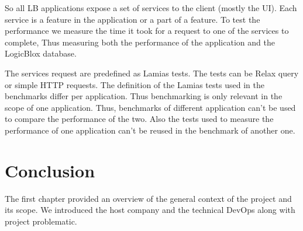 So all LB applications expose a set of services to the client (mostly the UI).
Each service is a feature in the application or a part of a feature. To test the
performance we measure the time it took for a request to one of the services to
complete, Thus measuring both the performance of the application and the
LogicBlox database.

The services request are predefined as Lamias tests. The tests can be Relax
query or simple HTTP requests. The definition of the Lamias tests used in the
benchmarks differ per application. Thus benchmarking is only relevant in the
scope of one application. Thus, benchmarks of different application can't be
used to compare the performance of the two. Also the tests used to measure the
performance of one application can't be reused in the benchmark of another one.

\section*{Conclusion}
The first chapter provided an overview of the general context of the project and
its scope. We introduced the host company and the technical DevOps along with
project problematic.
